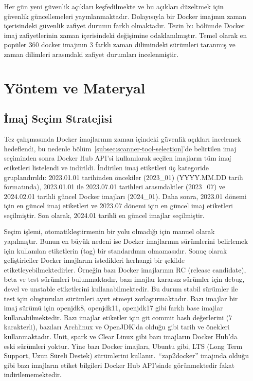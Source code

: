 Her gün yeni güvenlik açıkları keşfedilmekte ve bu açıkları düzeltmek için güvenlik güncellemeleri yayınlanmaktadır. Dolayısıyla bir Docker imajının zaman içerisindeki güvenlik zafiyet durumu farklı olmaktadır. Tezin bu bölümde Docker imaj zafiyetlerinin zaman içerisindeki değişimine odaklanılmıştır. Temel olarak en popüler 360 docker imajının 3 farklı zaman dilimindeki sürümleri taranmış ve zaman dilimleri arasındaki zafiyet durumları incelenmiştir.

\section{Yöntem ve Materyal}

\subsection{İmaj Seçim Stratejisi}\label{subsec:image-selection-strategy}

Tez çalışmasında Docker imajlarının zaman içindeki güvenlik açıkları incelemek hedeflendi, bu nedenle bölüm~\ref{subsec:scanner-tool-selection}'de belirtilen imaj seçiminden sonra Docker Hub API'si kullanılarak seçilen imajların tüm imaj etiketleri listelendi ve indirildi. İndirilen imaj etiketleri üç kategoride gruplandırıldı: 2023.01.01 tarihinden öncekiler (2023\_01) (YYYY.MM.DD tarih formatında), 2023.01.01 ile 2023.07.01 tarihleri arasındakiler (2023\_07) ve 2024.02.01 tarihli güncel Docker imajları (2024\_01). Daha sonra, 2023.01 dönemi için en güncel imaj etiketleri ve 2023.07 dönemi için en güncel imaj etiketleri seçilmiştir. Son olarak, 2024.01 tarihli en güncel imajlar seçilmiştir.

Seçim işlemi, otomatikleştirmenin bir yolu olmadığı için manuel olarak yapılmıştır. Bunun en büyük nedeni ise Docker imajlarının sürümlerini belirlemek için kullanılan etiketlerin (tag) bir standardının olmamasıdır. Sonuç olarak geliştiriciler Docker imajlarını istedikleri herhangi bir şekilde etiketleyebilmektedirler. Örneğin bazı Docker imajlarının RC (release candidate), beta ve test sürümleri bulunmaktadır, bazı imajlar kararsız sürümler için debug, devel ve unstable etiketlerini kullanabilmektedir. Bu durum stabil sürümler ile test için oluşturulan sürümleri ayırt etmeyi zorlaştırmaktadır. Bazı imajlar bir imaj sürümü için openjdk8, openjdk11, openjdk17 gibi farklı base imajlar kullanabilmektedir. Bazı imajlar etiketler için git commit hash değerlerini (7 karakterli), bazıları Archlinux ve OpenJDK'da olduğu gibi tarih ve önekleri kullanmaktadır. Unit, spark ve Clear Linux gibi bazı imajların Docker Hub'da eski sürümleri yoktur. Yine bazı Docker imajları, Ubuntu gibi, LTS (Long Term Support, Uzun Süreli Destek) sürümlerini kullanır.\ ``zap2docker'' imajında olduğu gibi bazı imajların etiket bilgileri Docker Hub API'sinde görünmektedir fakat indirilememektedir.

